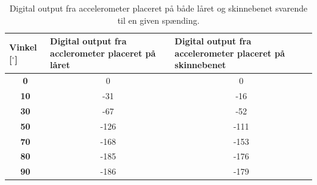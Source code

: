 \begin{table}[H]
\centering
\begin{tabular}{|c|c|c|}
\hline
\multicolumn{1}{|l|}{\textbf{Vinkel {[}$^{\circ}${]}}} & \multicolumn{1}{l|}{\textbf{Digital output fra acclerometer placeret på låret}} & \multicolumn{1}{l|}{\textbf{Digital output fra accelerometer placeret på skinnebenet}} \\ \hline
\textbf{0}                                                      & 0                                                                               & 0                                                                                      \\ \hline
\textbf{10}                                                     & -31                                                                             & -16                                                                                    \\ \hline
\textbf{30}                                                     & -67                                                                             & -52                                                                                    \\ \hline
\textbf{50}                                                     & -126                                                                            & -111                                                                                   \\ \hline
\textbf{70}                                                     & -168                                                                            & -153                                                                                   \\ \hline
\textbf{80}                                                     & -185                                                                            & -176                                                                                   \\ \hline
\textbf{90}                                                     & -186                                                                            & -179                                                                                   \\ \hline
\end{tabular}
\caption{Digital output fra accelerometer placeret på både låret og skinnebenet svarende til en given spænding.}
\label{tab:vinkelinterval_psoc}  
\end{table}

